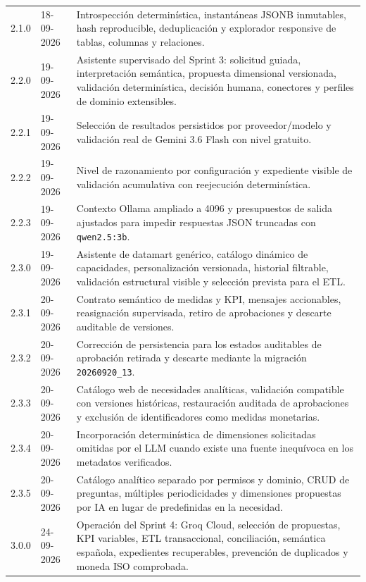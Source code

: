 \documentclass[11pt,letterpaper]{article}
\newcommand{\file}[1]{\texttt{#1}}
\begin{document}
\begin{longtable}{@{}p{}p{}p{}@{}}
  2.1.0 & 18-09-2026 & Introspección determinística, instantáneas JSONB inmutables, hash reproducible, deduplicación y explorador responsive de tablas, columnas y relaciones. \\
  2.2.0 & 19-09-2026 & Asistente supervisado del Sprint 3: solicitud guiada, interpretación semántica, propuesta dimensional versionada, validación determinística, decisión humana, conectores y perfiles de dominio extensibles. \\
  2.2.1 & 19-09-2026 & Selección de resultados persistidos por proveedor/modelo y validación real de Gemini 3.6 Flash con nivel gratuito. \\
  2.2.2 & 19-09-2026 & Nivel de razonamiento por configuración y expediente visible de validación acumulativa con reejecución determinística. \\
  2.2.3 & 19-09-2026 & Contexto Ollama ampliado a 4096 y presupuestos de salida ajustados para impedir respuestas JSON truncadas con \file{qwen2.5:3b}. \\
  2.3.0 & 19-09-2026 & Asistente de datamart genérico, catálogo dinámico de capacidades, personalización versionada, historial filtrable, validación estructural visible y selección prevista para el ETL. \\
  2.3.1 & 20-09-2026 & Contrato semántico de medidas y KPI, mensajes accionables, reasignación supervisada, retiro de aprobaciones y descarte auditable de versiones. \\
  2.3.2 & 20-09-2026 & Corrección de persistencia para los estados auditables de aprobación retirada y descarte mediante la migración \file{20260920\_13}. \\
  2.3.3 & 20-09-2026 & Catálogo web de necesidades analíticas, validación compatible con versiones históricas, restauración auditada de aprobaciones y exclusión de identificadores como medidas monetarias. \\
  2.3.4 & 20-09-2026 & Incorporación determinística de dimensiones solicitadas omitidas por el LLM cuando existe una fuente inequívoca en los metadatos verificados. \\
  2.3.5 & 20-09-2026 & Catálogo analítico separado por permisos y dominio, CRUD de preguntas, múltiples periodicidades y dimensiones propuestas por IA en lugar de predefinidas en la necesidad. \\
  3.0.0 & 24-09-2026 & Operación del Sprint 4: Groq Cloud, selección de propuestas, KPI variables, ETL transaccional, conciliación, semántica española, expedientes recuperables, prevención de duplicados y moneda ISO comprobada. \\

\end{longtable}
\end{document}
